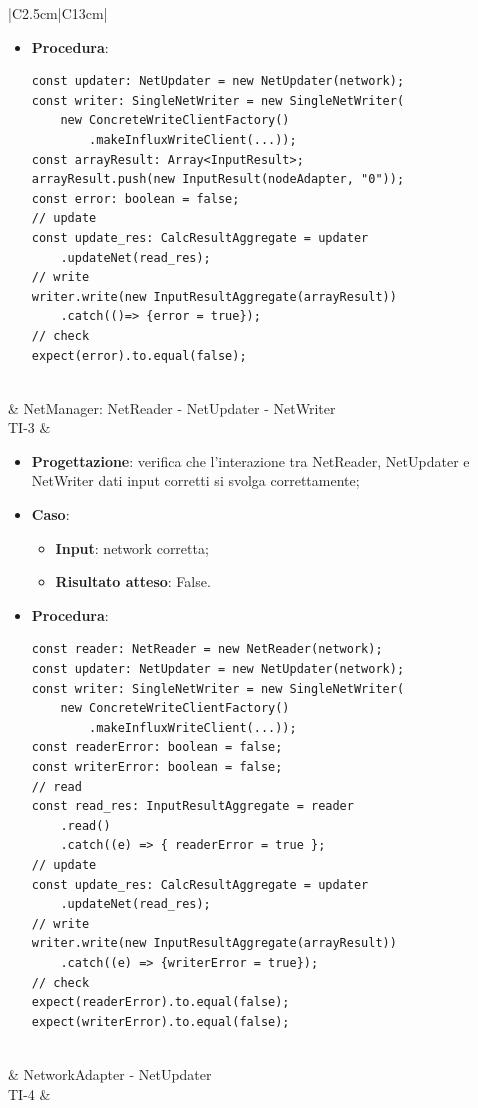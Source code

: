 \begin{longtable}{|C{2.5cm}|C{13cm}|}
\begin{itemize}
\begin{itemize}
			\item \textbf{Risultato atteso}: False.
		\end{itemize}
		\item \textbf{Procedura}:
		\begin{lstlisting}
const updater: NetUpdater = new NetUpdater(network);
const writer: SingleNetWriter = new SingleNetWriter(
	new ConcreteWriteClientFactory()
		.makeInfluxWriteClient(...));
const arrayResult: Array<InputResult>;
arrayResult.push(new InputResult(nodeAdapter, "0"));
const error: boolean = false;
// update
const update_res: CalcResultAggregate = updater
	.updateNet(read_res);
// write
writer.write(new InputResultAggregate(arrayResult))
	.catch(()=> {error = true});
// check
expect(error).to.equal(false); 
		\end{lstlisting}
	\end{itemize} \\		
	\hline \newpage	\hline
	 & NetManager: NetReader - NetUpdater - NetWriter\\
	\hline	
	{TI-3} & 

	\begin{itemize}
		\item \textbf{Progettazione}: verifica che l'interazione tra NetReader, NetUpdater e NetWriter dati input corretti si svolga correttamente;
		\item \textbf{Caso}: 
		\begin{itemize}
			\item \textbf{Input}: network corretta;
			\item \textbf{Risultato atteso}: False.
		\end{itemize}
		\item \textbf{Procedura}:
		\begin{lstlisting}
const reader: NetReader = new NetReader(network);
const updater: NetUpdater = new NetUpdater(network);
const writer: SingleNetWriter = new SingleNetWriter(
	new ConcreteWriteClientFactory()
		.makeInfluxWriteClient(...));
const readerError: boolean = false;
const writerError: boolean = false;
// read
const read_res: InputResultAggregate = reader
	.read()
	.catch((e) => { readerError = true };
// update
const update_res: CalcResultAggregate = updater
	.updateNet(read_res);
// write
writer.write(new InputResultAggregate(arrayResult))
	.catch((e) => {writerError = true});
// check
expect(readerError).to.equal(false); 
expect(writerError).to.equal(false); 
		\end{lstlisting}
	\end{itemize} \\		
	\hline \newpage	\hline
	 & NetworkAdapter - NetUpdater \\
	\hline	
	{TI-4} & 
	

\end{longtable}

